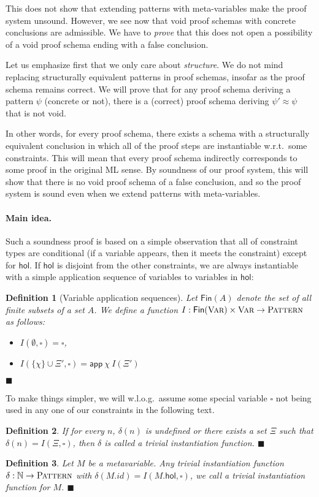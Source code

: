\documentclass{article}
\newcommand{\xqed}[1]{%
    \leavevmode\unskip\penalty9999 \hbox{}\nobreak\hfill
    \quad\hbox{\ensuremath{#1}}}
\newcommand{\xqedhere}{\xqed{\blacksquare}}
\newtheorem{deff}{Definition}
\newenvironment{definition}[1]{%
  \begin{deff}#1}{%
  \xqedhere\end{deff}%
}
\numberwithin{deff}{section}
\numberwithin{lemma*}{section}
\newcommand{\Nat}{\mathbb{N}}
\newcommand{\Pat}{\textsc{Pattern}}
\newcommand{\Var}{\textsc{Var}}
\newcommand{\s}[1]{\{ #1 \}}
\newcommand{\ML}{\textsf{ML}\xspace}
\newcommand{\wrt}{w.r.t.~}
\newcommand{\Hol}{\mathsf{hol}}
\begin{document}
This does not show that extending patterns with meta-variables make the proof system  unsound.
However, we see now that void proof schemas with concrete conclusions are admissible.
We have to \emph{prove} that this does not open a possibility of a void proof schema ending with a false conclusion.

Let us emphasize first that we only care about \emph{structure}.
We do not mind replacing structurally equivalent patterns in proof schemas, insofar as the proof schema remains correct.
We will prove that for any proof schema deriving a pattern $\psi$ (concrete or not), there is a (correct) proof schema deriving $\psi' \approx \psi$ that is not void.

In other words, for every proof schema, there exists a schema with a structurally equivalent conclusion in which all of the proof steps are instantiable \wrt some constraints.
This will mean that every proof schema indirectly corresponds to some proof in the original \ML sense.
By soundness of our proof system, this will show that there is no void proof schema of a false conclusion, and so the proof system is sound even when we extend patterns with meta-variables.

\paragraph{Main idea.} Such a soundness proof is based on a simple observation that all of constraint types are conditional (if a variable appears, then it meets the constraint) except for $\Hol$.
If $\Hol$ is disjoint from the other constraints, we are always instantiable with a simple application sequence of variables to variables in $\Hol$:
\begin{definition}[Variable application sequences]
  Let $\mathsf{Fin}(A)$ denote the set of all finite subsets of a set $A$.
  We define a function $I : \mathsf{Fin}(\Var) \times \Var \to \Pat$ as follows:
  \begin{itemize}
    \item $I(\emptyset, \square) = \square$,
    \item $I(\s{\chi} \cup \Xi', \square) = \mathsf{app}\ \chi\ I(\Xi')$
  \end{itemize}
\end{definition}

To make things simpler, we will w.l.o.g.~assume some special variable $\square$ not being used in any one of our constraints in the following text.

\begin{definition}
  If for every $n$, $\delta(n)$ is undefined or there exists a set $\Xi$ such that $\delta(n) = I(\Xi, \square)$, then $\delta$ is called a \emph{trivial instantiation function}.
\end{definition}
\begin{definition}
  Let $M$ be a metavariable.
  Any trivial instantiation function $\delta : \Nat \to \Pat$ with $\delta(M.id) = I(M.\Hol, \square)$, we call a trivial instantiation function  \emph{for} $M$.
\end{definition}
\end{document}
